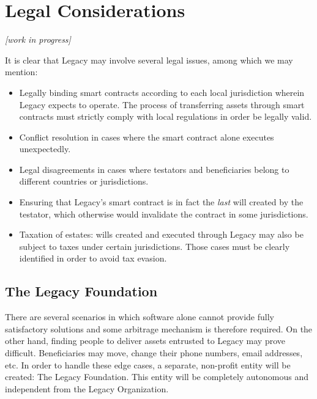 \chapter{Legal Considerations} %
\label{cha:legal_considerations}

\textit{[work in progress]}

\vspace{4mm}

It is clear that Legacy may involve several legal issues, among which we may mention:

\begin{itemize}
	\item Legally binding smart contracts according to each local jurisdiction wherein Legacy expects to operate. The process of transferring assets through smart contracts must strictly comply with local regulations in order be legally valid.
	\item Conflict resolution in cases where the smart contract alone executes unexpectedly.
	\item Legal disagreements in cases where testators and beneficiaries belong to different countries or jurisdictions.
	\item Ensuring that Legacy's smart contract is in fact the \textit{last} will created by the testator, which otherwise would invalidate the contract in some jurisdictions.
	\item Taxation of estates: wills created and executed through Legacy may also be subject to taxes under certain jurisdictions. Those cases must be clearly identified in order to avoid tax evasion.
\end{itemize}


\section{The Legacy Foundation} %
\label{sec:the_legacy_foundation}

There are several scenarios in which software alone cannot provide fully satisfactory solutions and some arbitrage mechanism is therefore required.
On the other hand, finding people to deliver assets entrusted to Legacy may prove difficult. Beneficiaries may move, change their phone numbers, email addresses, etc.
In order to handle these edge cases, a separate, non-profit entity will be created: The Legacy Foundation. This entity will be completely autonomous and independent from the Legacy Organization.

